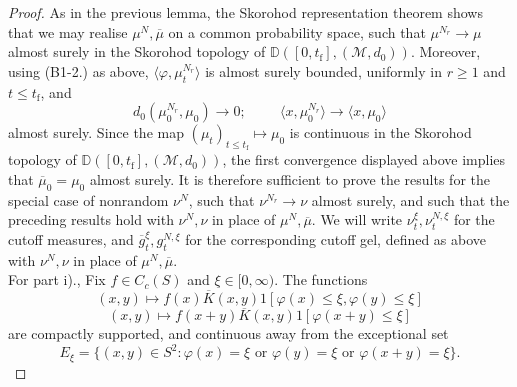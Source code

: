 \documentclass[11pt, notitlepage]{article}
\begin{document}
\begin{proof} As in the previous lemma, the Skorohod representation theorem shows that we may realise $\mu^N, \overline{\mu}$ on a common probability space, such that $\mu^{N_r}\rightarrow \mu$ almost surely in the Skorohod topology of $\mathbb{D}([0,t_\mathrm{f}],(\mathcal{M},d_0))$. Moreover, using (B1-2.) as above, $\langle \varphi, \mu^{N_r}_t\rangle$ is almost surely bounded, uniformly in $r\ge 1$ and $t\le t_\mathrm{f}$, and  \begin{equation}  d_0(\mu^{N_r}_0,\mu_0)\rightarrow 0; \hspace{1cm} \langle x, \mu^{N_r}_0\rangle \rightarrow \langle x, \mu_0\rangle \end{equation} almost surely. Since the map $(\mu_t)_{t\le t_\mathrm{f}}\mapsto \mu_0$ is continuous in the Skorohod topology of $\mathbb{D}([0,t_\mathrm{f}],(\mathcal{M},d_0))$, the first convergence displayed above implies that $\overline{\mu}_0=\mu_0$ almost surely. It is therefore sufficient to prove the results for the special case of nonrandom $\nu^N$, such that  $\nu^{N_r}\rightarrow \nu$ almost surely, and such that the preceding results hold with $\nu^N, \nu$ in place of $\mu^N, \overline{\mu}$. We will write $\nu_t^\xi, \nu^{N,\xi}_t$ for the cutoff measures, and $\overline{g}^\xi_t, g^{N,\xi}_t$ for the corresponding cutoff gel, defined as above with $\nu^N, \nu$ in place of $\mu^N, \overline{\mu}$.  \medskip \\ 
For part i)., Fix $f\in C_c(S)$ and $\xi\in [0, \infty)$. The functions \begin{equation}(x,y) \mapsto f(x)\overline{K}(x,y)1[\varphi(x) \le \xi,\varphi(y) \leq \xi]\end{equation} \begin{equation} (x,y)\mapsto f(x+y)\overline{K}(x,y)1[\varphi(x+y)\le \xi] \end{equation} are compactly supported, and continuous away from the exceptional set \begin{equation} E_\xi=\{(x,y)\in S^2: \varphi(x)=\xi \text{ or } \varphi(y)=\xi \text{ or } \varphi(x+y)=\xi\}. \end{equation} 


\end{proof}
\end{document}

